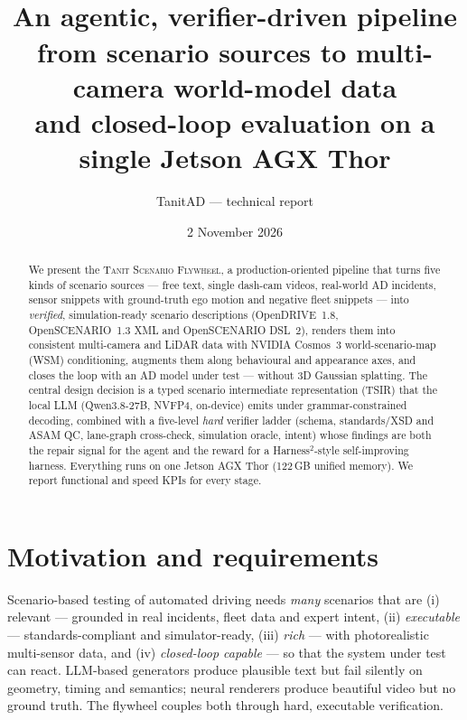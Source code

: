 \documentclass[10pt,a4paper]{article}
\title{\vspace{-1.2em}\textbf{\tsf}\\[0.3em]
\large An agentic, verifier-driven pipeline from scenario sources to multi-camera world-model data\\
and closed-loop evaluation on a single Jetson AGX Thor}
\author{TanitAD --- technical report}
\date{2 November 2026}
\newcommand{\tsf}{\textsc{Tanit Scenario Flywheel}}
\begin{document}
\maketitle

\begin{abstract}
We present the \tsf, a production-oriented pipeline that turns five kinds of scenario sources --- free text,
single dash-cam videos, real-world AD incidents, sensor snippets with ground-truth ego motion and negative
fleet snippets --- into \emph{verified}, simulation-ready scenario descriptions (OpenDRIVE~1.8, OpenSCENARIO~1.3
XML and OpenSCENARIO DSL~2), renders them into consistent multi-camera and LiDAR data with NVIDIA Cosmos~3
world-scenario-map (WSM) conditioning, augments them along behavioural and appearance axes, and closes the
loop with an AD model under test --- without 3D Gaussian splatting. The central design decision is a typed
scenario intermediate representation (TSIR) that the local LLM (Qwen3.8-27B, NVFP4, on-device) emits under
grammar-constrained decoding, combined with a five-level \emph{hard} verifier ladder (schema, standards/XSD and
ASAM QC, lane-graph cross-check, simulation oracle, intent) whose findings are both the repair signal for the
agent and the reward for a Harness$^2$-style self-improving harness. Everything runs on one Jetson AGX Thor
(122\,GB unified memory). We report functional and speed KPIs for every stage.
\end{abstract}

\tableofcontents
\newpage

\section{Motivation and requirements}
Scenario-based testing of automated driving needs \emph{many} scenarios that are (i) relevant --- grounded
in real incidents, fleet data and expert intent, (ii) \emph{executable} --- standards-compliant and
simulator-ready, (iii) \emph{rich} --- with photorealistic multi-sensor data, and (iv) \emph{closed-loop
capable} --- so that the system under test can react. LLM-based generators produce plausible text but
fail silently on geometry, timing and semantics; neural renderers produce beautiful video but no ground
truth. The flywheel couples both through hard, executable verification.
\end{document}
